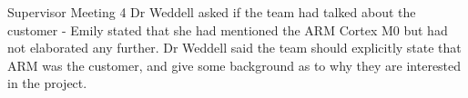 \documentclass{article}
\begin{document}
\begin{Minutes}{Supervisor Meeting 4}
Dr Weddell asked if the team had talked about the customer - Emily stated that she had mentioned the ARM Cortex M0 but had not elaborated any further.
Dr Weddell said the team should explicitly state that ARM was the customer, and give some background as to why they are interested in the project.


\end{Minutes}
\end{document}

